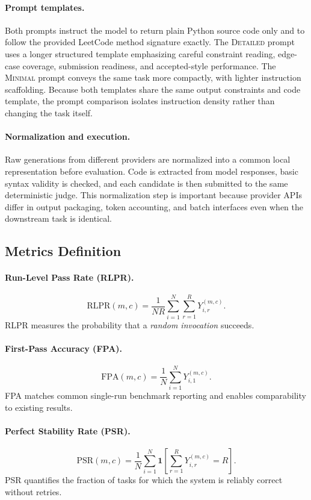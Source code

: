 \documentclass[11pt]{article}
\begin{document}
\paragraph{Prompt templates.} Both prompts instruct the model to return plain Python source code only and to follow the provided LeetCode method signature exactly. The \textsc{Detailed} prompt uses a longer structured template emphasizing careful constraint reading, edge-case coverage, submission readiness, and accepted-style performance. The \textsc{Minimal} prompt conveys the same task more compactly, with lighter instruction scaffolding. Because both templates share the same output constraints and code template, the prompt comparison isolates instruction density rather than changing the task itself.

\paragraph{Normalization and execution.} Raw generations from different providers are normalized into a common local representation before evaluation. Code is extracted from model responses, basic syntax validity is checked, and each candidate is then submitted to the same deterministic judge. This normalization step is important because provider APIs differ in output packaging, token accounting, and batch interfaces even when the downstream task is identical.

\subsection{Metrics Definition}

\paragraph{Run-Level Pass Rate (RLPR).}
$$
\mathrm{RLPR}(m,c)=\frac{1}{NR}\sum_{i=1}^{N}\sum_{r=1}^{R} Y_{i,r}^{(m,c)}.
$$
RLPR measures the probability that a \emph{random invocation} succeeds.

\paragraph{First-Pass Accuracy (FPA).}
$$
\mathrm{FPA}(m,c)=\frac{1}{N}\sum_{i=1}^{N} Y_{i,1}^{(m,c)}.
$$
FPA matches common single-run benchmark reporting and enables comparability to existing results.

\paragraph{Perfect Stability Rate (PSR).}
$$
\mathrm{PSR}(m,c)=\frac{1}{N}\sum_{i=1}^{N} \mathbf{1}\!\left[\sum_{r=1}^{R} Y_{i,r}^{(m,c)}=R\right].
$$
PSR quantifies the fraction of tasks for which the system is reliably correct without retries.
\end{document}

